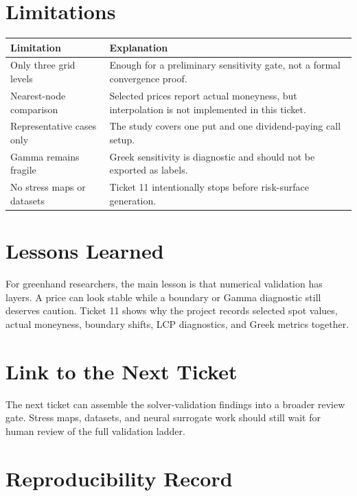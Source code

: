 \documentclass[11pt,a4paper]{article}
\begin{document}
\section{Limitations}

\begin{longtable}{P{0.32\textwidth}L{0.48\textwidth}}
\toprule
Limitation & Explanation \\
\midrule
\endhead
Only three grid levels & Enough for a preliminary sensitivity gate, not a formal convergence proof. \\
Nearest-node comparison & Selected prices report actual moneyness, but interpolation is not implemented in this ticket. \\
Representative cases only & The study covers one put and one dividend-paying call setup. \\
Gamma remains fragile & Greek sensitivity is diagnostic and should not be exported as labels. \\
No stress maps or datasets & Ticket 11 intentionally stops before risk-surface generation. \\
\bottomrule
\end{longtable}

\section{Lessons Learned}

For greenhand researchers, the main lesson is that numerical validation has layers. A price can
look stable while a boundary or Gamma diagnostic still deserves caution. Ticket 11 shows why the
project records selected spot values, actual moneyness, boundary shifts, LCP diagnostics, and
Greek metrics together.

\section{Link to the Next Ticket}

The next ticket can assemble the solver-validation findings into a broader review gate. Stress
maps, datasets, and neural surrogate work should still wait for human review of the full
validation ladder.

\section{Reproducibility Record}
\end{document}
